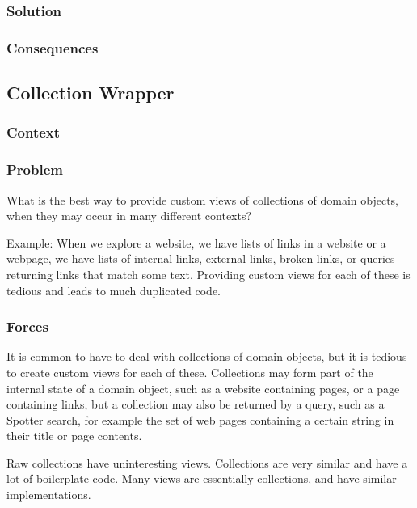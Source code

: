 \documentclass[sigconf]{acmart}
\begin{document}
\subsubsection*{Solution}
\subsubsection*{Consequences}

\subsection*{Collection Wrapper}\label{pat:collectionWrapper}
\subsubsection*{Context}
\subsubsection*{Problem}

What is the best way to provide custom views of collections of domain objects, when they may occur in many different contexts?

Example:
When we explore a website, we have lists of links in a website or a webpage, we have lists of internal links, external links, broken links, or queries returning links that match some text. Providing custom views for each of these is tedious and leads to much duplicated code.

\subsubsection*{Forces}

It is common to have to deal with collections of domain objects, but it is tedious to create custom views for each of these. Collections may form part of the internal state of a domain object, such as a website containing pages, or a page containing links, but a collection may also be returned by a query, such as a Spotter search, for example the set of web pages containing a certain string in their title or page contents.

Raw collections have uninteresting views. Collections are very similar and have a lot of boilerplate code. Many views are essentially collections, and have similar implementations.
\end{document}
